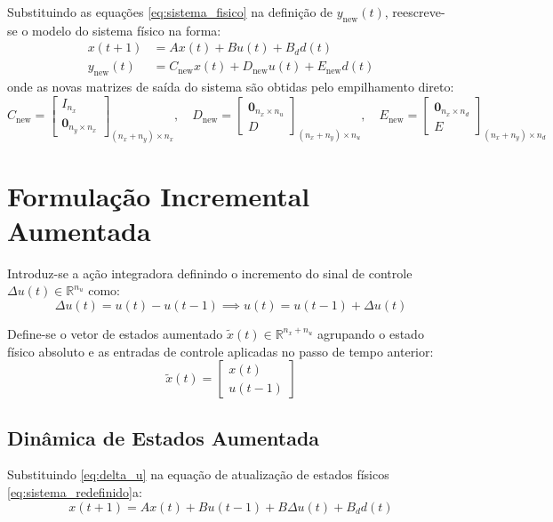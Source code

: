 \documentclass[12pt]{article}
\begin{document}
Substituindo as equações \eqref{eq:sistema_fisico} na definição de $y_{\text{new}}(t)$, reescreve-se o modelo do sistema físico na forma:
\begin{subequations}
\label{eq:sistema_redefinido}
\begin{align}
x(t+1) &= A x(t) + B u(t) + B_d d(t) \\
y_{\text{new}}(t) &= C_{\text{new}} x(t) + D_{\text{new}} u(t) + E_{\text{new}} d(t)
\end{align}
\end{subequations}
onde as novas matrizes de saída do sistema são obtidas pelo empilhamento direto:
\begin{equation}
C_{\text{new}} = \begin{bmatrix} I_{n_x} \\ \bm{0}_{n_y \times n_x} \end{bmatrix}_{(n_x+n_y) \times n_x}, \quad
D_{\text{new}} = \begin{bmatrix} \bm{0}_{n_x \times n_u} \\ D \end{bmatrix}_{(n_x+n_y) \times n_u}, \quad
E_{\text{new}} = \begin{bmatrix} \bm{0}_{n_x \times n_d} \\ E \end{bmatrix}_{(n_x+n_y) \times n_d}
\end{equation}

\section{Formulação Incremental Aumentada}

Introduz-se a ação integradora definindo o incremento do sinal de controle $\Delta u(t) \in \mathbb{R}^{n_u}$ como:
\begin{equation}
\label{eq:delta_u}
\Delta u(t) = u(t) - u(t-1) \implies u(t) = u(t-1) + \Delta u(t)
\end{equation}

Define-se o vetor de estados aumentado $\tilde{x}(t) \in \mathbb{R}^{n_x + n_u}$ agrupando o estado físico absoluto e as entradas de controle aplicadas no passo de tempo anterior:
\begin{equation}
\tilde{x}(t) = \begin{bmatrix} x(t) \\ u(t-1) \end{bmatrix}
\end{equation}

\subsection{Dinâmica de Estados Aumentada}
Substituindo \eqref{eq:delta_u} na equação de atualização de estados físicos \eqref{eq:sistema_redefinido}a:
\begin{equation}
x(t+1) = A x(t) + B u(t-1) + B \Delta u(t) + B_d d(t)
\end{equation}
\end{document}
